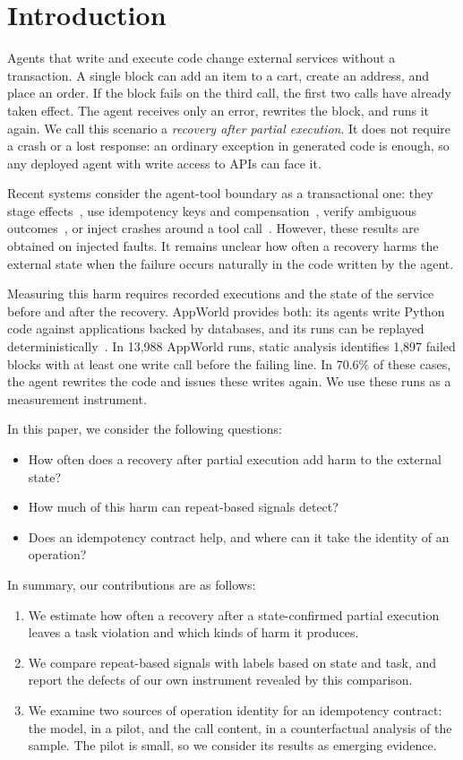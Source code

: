 \documentclass[conference]{IEEEtran}
\begin{document}
\section{Introduction}

Agents that write and execute code change external services without a transaction. A single block can add an item to a cart, create an address, and place an order. If the block fails on the third call, the first two calls have already taken effect. The agent receives only an error, rewrites the block, and runs it again. We call this scenario a \emph{recovery after partial execution}. It does not require a crash or a lost response: an ordinary exception in generated code is enough, so any deployed agent with write access to APIs can face it.

Recent systems consider the agent-tool boundary as a transactional one: they stage effects~\cite{chen2026cordon}, use idempotency keys and compensation~\cite{mohammadi2026atomix,perera2026rac}, verify ambiguous outcomes~\cite{mansoor2026verified}, or inject crashes around a tool call~\cite{mohammadi2026rubicon}. However, these results are obtained on injected faults. It remains unclear how often a recovery harms the external state when the failure occurs naturally in the code written by the agent.

Measuring this harm requires recorded executions and the state of the service before and after the recovery. AppWorld provides both: its agents write Python code against applications backed by databases, and its runs can be replayed deterministically~\cite{trivedi2024appworld}. In 13{,}988 AppWorld runs, static analysis identifies 1{,}897 failed blocks with at least one write call before the failing line. In 70.6\% of these cases, the agent rewrites the code and issues these writes again. We use these runs as a measurement instrument.

In this paper, we consider the following questions:
\begin{itemize}
\item[\textbf{Q1}] How often does a recovery after partial execution add harm to the external state?
\item[\textbf{Q2}] How much of this harm can repeat-based signals detect?
\item[\textbf{Q3}] Does an idempotency contract help, and where can it take the identity of an operation?
\end{itemize}

In summary, our contributions are as follows:
\begin{enumerate}
\item We estimate how often a recovery after a state-confirmed partial execution leaves a task violation and which kinds of harm it produces.
\item We compare repeat-based signals with labels based on state and task, and report the defects of our own instrument revealed by this comparison.
\item We examine two sources of operation identity for an idempotency contract: the model, in a pilot, and the call content, in a counterfactual analysis of the sample. The pilot is small, so we consider its results as emerging evidence.
\end{enumerate}
\end{document}
